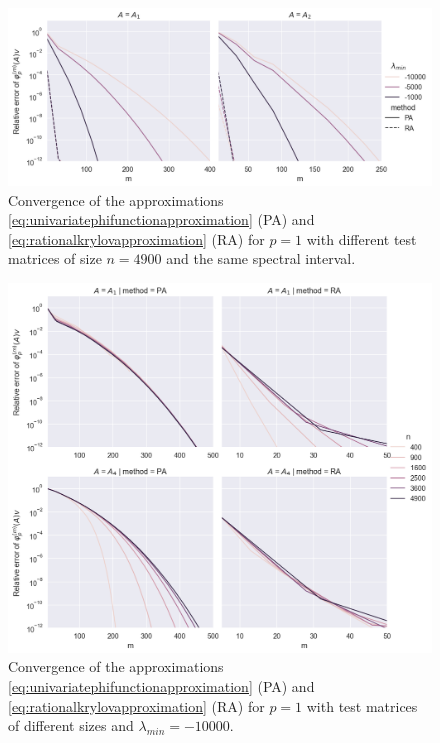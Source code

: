 \begin{figure}[h!]
    \centering
    \includegraphics[width=.9\textwidth]{img/krylovapproximation/cnvg_methods_p1_4900.png}
    \caption{Convergence of the approximations \eqref{eq:univariatephifunctionapproximation} (PA) and \eqref{eq:rationalkrylovapproximation} (RA)
    for $p=1$ with different test matrices of size $n=4900$ and the same spectral interval.}
    \label{fig:krylovapproximationmethodscompared}
\end{figure}

\begin{figure}[h!]
    \centering
    \includegraphics[width=.8\textwidth]{img/krylovapproximation/cnvg_sizes_p1_lambda10000.png}
    \caption{Convergence of the approximations \eqref{eq:univariatephifunctionapproximation} (PA) and \eqref{eq:rationalkrylovapproximation} (RA)
    for $p=1$ with test matrices of different sizes and $\lambda_{min} = -10000$.}
    \label{fig:krylovapproximationsizes}
\end{figure}
